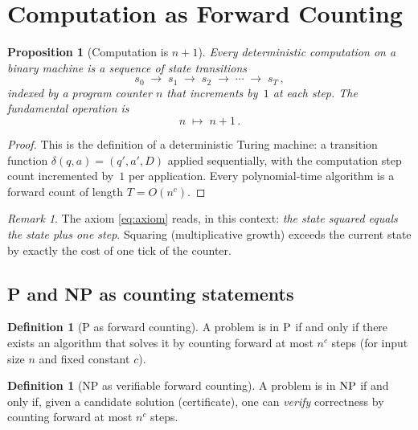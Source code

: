 \documentclass[12pt, a4paper]{article}
\theoremstyle{plain}
\newtheorem{proposition}[theorem]{Proposition}
\theoremstyle{definition}
\newtheorem{definition}[theorem]{Definition}
\theoremstyle{remark}
\newtheorem{remark}[theorem]{Remark}
\newcommand{\NP}{\textup{NP}}
\newcommand{\PP}{\textup{P}}
\begin{document}
\section{Computation as Forward Counting}
\label{sec:forward-counting}

\begin{proposition}[Computation is $n + 1$]
\label{prop:computation}
Every deterministic computation on a binary machine is a sequence of
state transitions
\[
  s_0 \;\to\; s_1 \;\to\; s_2 \;\to\; \cdots \;\to\; s_T\,,
\]
indexed by a program counter $n$ that increments by~$1$ at each step.
The fundamental operation is
\begin{equation}\label{eq:successor}
  n \;\mapsto\; n + 1\,.
\end{equation}
\end{proposition}

\begin{proof}
This is the definition of a deterministic Turing machine: a
transition function $\delta(q, a) = (q', a', D)$ applied
sequentially, with the computation step count incremented by~$1$ per
application.  Every polynomial-time algorithm is a forward count of
length $T = O(n^c)$.
\end{proof}

\begin{remark}
The axiom \eqref{eq:axiom} reads, in this context: \emph{the state
squared equals the state plus one step}.  Squaring (multiplicative
growth) exceeds the current state by exactly the cost of one tick of
the counter.
\end{remark}

\subsection{P and NP as counting statements}

\begin{definition}[P as forward counting]
A problem is in $\PP$ if and only if there exists an algorithm that
solves it by counting forward at most $n^c$ steps (for input size $n$
and fixed constant $c$).
\end{definition}

\begin{definition}[NP as verifiable forward counting]
A problem is in $\NP$ if and only if, given a candidate solution
(certificate), one can \emph{verify} correctness by counting forward
at most $n^c$ steps.
\end{definition}
\end{document}
